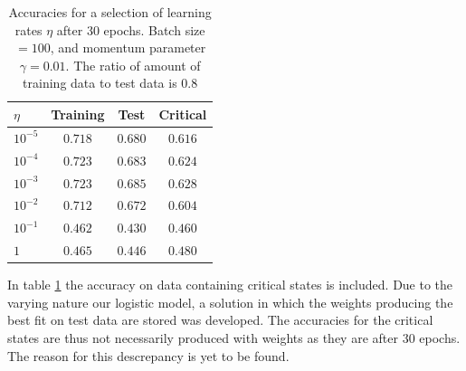 \begin{table}[H]
\centering
\begin{tabular}{l|c|c|c}
$\eta$ & Training & Test & Critical  \\
\hline
$10^{-5}$ & $0.718$ & $0.680$ & $0.616$ \\
$10^{-4}$ & $0.723$ & $0.683$ & $0.624$ \\
$10^{-3}$ & $0.723$ & $0.685$ & $0.628$ \\
$10^{-2}$ & $0.712$ & $0.672$ & $0.604$ \\
$10^{-1}$ & $0.462$ & $0.430$ & $0.460$ \\
$1$    & $0.465$ & $0.446$ & $0.480$
\end{tabular}
    \caption{Accuracies for a selection of learning rates $\eta$ after 
    30 epochs. Batch size $= 100$, and momentum parameter $\gamma = 0.01$.
    The ratio of amount of training data to test data is $0.8$}
    \label{tab:logistic-critical}
\end{table}
In table \ref{tab:logistic-critical} the accuracy on data containing critical 
states is included. Due to the varying nature our logistic model, a solution 
in which the weights producing the best fit on test data are stored was 
developed. The accuracies for the critical states are thus not necessarily 
produced with weights as they are after 30 epochs. The reason for this 
descrepancy is yet to be found.

